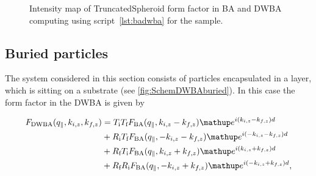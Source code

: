 \begin{figure}[tb]
\hfill
{}
\hfill
{}
\hfill
\caption{Intensity map of TruncatedSpheroid form factor in BA and DWBA computing using script~\ref{lst:badwba} for the sample.}
\label{fig:spheroidbadwba}
\end{figure}

\FloatBarrier


\subsection{Buried particles}

The system considered in this section consists of particles encapsulated in a layer, which is sitting on a substrate (see \cref{fig:SchemDWBAburied}). In this case the form factor in the DWBA is given by

\begin{align}
  F_{\rm{DWBA}}(q_{\plll}, k_{i,z}, k_{f,z})
  &= T_\si T_\sf F_{\rm{BA}}(q_{\plll}, k_{i,z}-k_{f,z})\e^{i(k_{i,z}-k_{f,z})d}\nonumber \\
  &+ R_\si T_\sf F_{\rm{BA}}(q_{\plll}, -k_{i,z}-k_{f,z})\e^{i(-k_{i,z}-k_{f,z})d} \nonumber \\
  &+ R_\sf T_\si F_{\rm{BA}}(q_{\plll}, k_{i,z}+k_{f,z}) \e^{i(k_{i,z}+k_{f,z})d}\nonumber \\
  &+ R_\sf R_\si F_{\rm{BA}}(q_{\plll},-k_{i,z}+k_{f,z})\e^{i(-k_{i,z}+k_{f,z})d}, \label{Edwbaburied}
\end{align}

